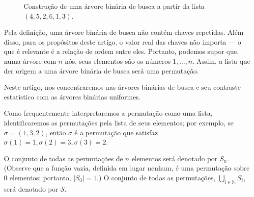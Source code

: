 \begin{figure}[h]
    \centering
    \caption{
        Construção de uma árvore binária de busca a partir da lista $(4, 5, 2, 6, 1, 3)$.
    }
    \label{fig:bst-construction}
\end{figure}

Pela definição,
uma árvore binária de busca não contém chaves repetidas.
Além disso,
para os propósitos deste artigo,
o valor real das chaves não importa
--- o que é relevante é a relação de ordem entre eles.
Portanto,
podemos supor que,
numa árvore com $n$ nós,
seus elementos são os números $1, \dots, n$.
Assim,
a lista que der origem a uma árvore binária de busca
será uma permutação.

Neste artigo,
nos concentraremos nas árvores binárias de busca
e seu contraste estatístico com as árvores binárias uniformes.

\begin{notation}
    Como frequentemente interpretaremos a permutação como uma lista,
    identificaremos as permutações pela lista de seus elementos;
    por exemplo, se $\sigma = (1, 3, 2)$,
    então $\sigma$ é a permutação que satisfaz
    $\sigma(1) = 1, \sigma(2) = 3, \sigma(3) = 2$.

    O conjunto de todas as permutações de $n$ elementos será denotado por $S_n$.
    (Observe que a função vazia, definida em lugar nenhum,
    é uma permutação sobre $0$ elementos;
    portanto, $|S_0| = 1$.)
    O conjunto de todas as permutações, $\bigcup_{i \in \mathbb N} S_i$,
    será denotado por $\mathcal S$.
\end{notation}
